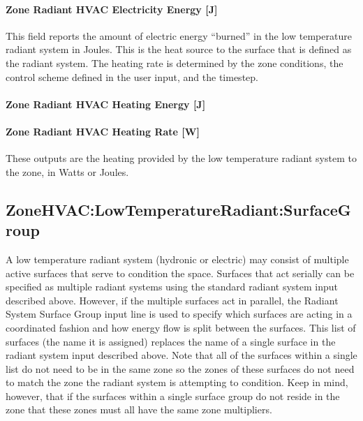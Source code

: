 \paragraph{Zone Radiant HVAC Electricity Energy {[}J{]}}\label{zone-radiant-hvac-electric-energy-j}

This field reports the amount of electric energy ``burned'' in the low temperature radiant system in Joules. This is the heat source to the surface that is defined as the radiant system. The heating rate is determined by the zone conditions, the control scheme defined in the user input, and the timestep.

\paragraph{Zone Radiant HVAC Heating Energy {[}J{]}}\label{zone-radiant-hvac-heating-energy-j-2}

\paragraph{Zone Radiant HVAC Heating Rate {[}W{]}}\label{zone-radiant-hvac-heating-rate-w-2}

These outputs are the heating provided by the low temperature radiant system to the zone, in Watts or Joules.

\subsection{ZoneHVAC:LowTemperatureRadiant:SurfaceGroup}\label{zonehvaclowtemperatureradiantsurfacegroup}

A low temperature radiant system (hydronic or electric) may consist of multiple active surfaces that serve to condition the space. Surfaces that act serially can be specified as multiple radiant systems using the standard radiant system input described above. However, if the multiple surfaces act in parallel, the Radiant System Surface Group input line is used to specify which surfaces are acting in a coordinated fashion and how energy flow is split between the surfaces. This list of surfaces (the name it is assigned) replaces the name of a single surface in the radiant system input described above. Note that all of the surfaces within a single list do not need to be in the same zone so the zones of these surfaces do not need to match the zone the radiant system is attempting to condition. Keep in mind, however, that if the surfaces within a single surface group do not reside in the zone that these zones must all have the same zone multipliers.

